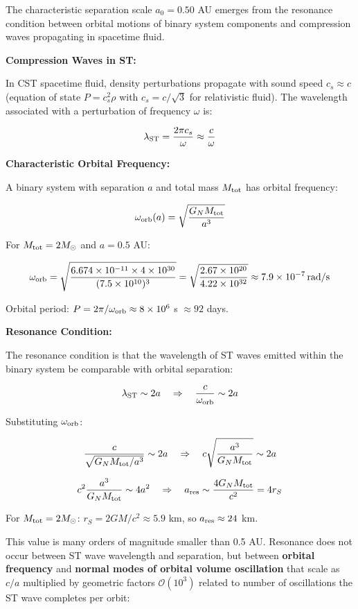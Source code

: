 \documentclass[11pt,a4paper]{article}
\begin{document}
The characteristic separation scale \(a_0 = 0.50\) AU emerges from the
resonance condition between orbital motions of binary system components
and compression waves propagating in spacetime fluid.

\textbf{Compression Waves in ST:}

In CST spacetime fluid, density perturbations propagate with sound speed
\(c_s \approx c\) (equation of state \(P = c_s^2\rho\) with
\(c_s = c/\sqrt{3}\) for relativistic fluid). The wavelength associated
with a perturbation of frequency \(\omega\) is:

\[\lambda_{\rm ST} = \frac{2\pi c_s}{\omega} \approx \frac{c}{\omega}\]

\textbf{Characteristic Orbital Frequency:}

A binary system with separation \(a\) and total mass \(M_{\rm tot}\) has
orbital frequency:

\[\omega_{\rm orb}(a) = \sqrt{\frac{G_N M_{\rm tot}}{a^3}}\]

For \(M_{\rm tot} = 2 M_\odot\) and \(a = 0.5\) AU:

\[\omega_{\rm orb} = \sqrt{\frac{6.674\times10^{-11} \times 4\times10^{30}}{(7.5\times10^{10})^3}} = \sqrt{\frac{2.67\times10^{20}}{4.22\times10^{32}}} \approx 7.9\times10^{-7}\,\mathrm{rad/s}\]

Orbital period: \(P = 2\pi/\omega_{\rm orb} \approx 8\times10^6\) s
\(\approx 92\) days.

\textbf{Resonance Condition:}

The resonance condition is that the wavelength of ST waves emitted
within the binary system be comparable with orbital separation:

\[\lambda_{\rm ST} \sim 2a \quad \Rightarrow \quad \frac{c}{\omega_{\rm orb}} \sim 2a\]

Substituting \(\omega_{\rm orb}\):

\[\frac{c}{\sqrt{G_N M_{\rm tot}/a^3}} \sim 2a \quad \Rightarrow \quad c\sqrt{\frac{a^3}{G_N M_{\rm tot}}} \sim 2a\]

\[c^2 \frac{a^3}{G_N M_{\rm tot}} \sim 4a^2 \quad \Rightarrow \quad a_{\rm res} \sim \frac{4 G_N M_{\rm tot}}{c^2} = 4 r_S\]

For \(M_{\rm tot} = 2 M_\odot\): \(r_S = 2GM/c^2 \approx 5.9\) km, so
\(a_{\rm res} \approx 24\) km.

This value is many orders of magnitude smaller than 0.5 AU. Resonance
does not occur between ST wave wavelength and separation, but between
\textbf{orbital frequency} and \textbf{normal modes of orbital volume
oscillation} that scale as \(c/a\) multiplied by geometric factors
\(\mathcal{O}(10^3)\) related to number of oscillations the ST wave
completes per orbit:
\end{document}
